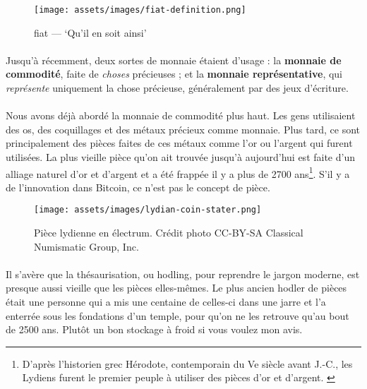 \begin{figure}
  \centering
  \texttt{[image: assets/images/fiat-definition.png]}
  \caption{fiat --- `Qu'il en soit ainsi'}
  \label{fig:fiat-definition}
\end{figure}

\paragraph{}
Jusqu'à récemment, deux sortes de monnaie étaient d'usage : la \textbf{monnaie
de commodité}, faite de \textit{choses} précieuses ; et la \textbf{monnaie
représentative}, qui \textit{représente} uniquement la chose précieuse,
généralement par des jeux d'écriture.

\paragraph{}
Nous avons déjà abordé la monnaie de commodité plus haut. Les gens utilisaient
des os, des coquillages et des métaux précieux comme monnaie. Plus tard, ce sont
principalement des pièces faites de ces métaux comme l'or ou l'argent qui
furent utilisées. La plus vieille pièce qu'on ait trouvée jusqu'à aujourd'hui
est faite d'un alliage naturel d'or et d'argent et a été frappée il y a plus de
2700 ans\footnote{D'après l'historien grec Hérodote, contemporain du Ve siècle
avant J.-C., les Lydiens furent le premier peuple à utiliser des pièces d'or et
d'argent. \cite{coinage-origins}}. S'il y a de l'innovation dans Bitcoin, ce
n'est pas le concept de pièce.

\begin{figure}
  \centering
  \texttt{[image: assets/images/lydian-coin-stater.png]}
  \caption{Pièce lydienne en électrum. Crédit photo CC-BY-SA Classical
  Numismatic Group, Inc.}
  \label{fig:lydian-coin-stater}
\end{figure}

\paragraph{}
Il s'avère que la thésaurisation, ou hodling, pour reprendre le jargon moderne,
est presque aussi vieille que les pièces elles-mêmes. Le plus ancien hodler de
pièces était une personne qui a mis une centaine de celles-ci dans une jarre et
l'a enterrée sous les fondations d'un temple, pour qu'on ne les retrouve qu'au
bout de 2500 ans. Plutôt un bon stockage à froid si vous voulez mon avis.

